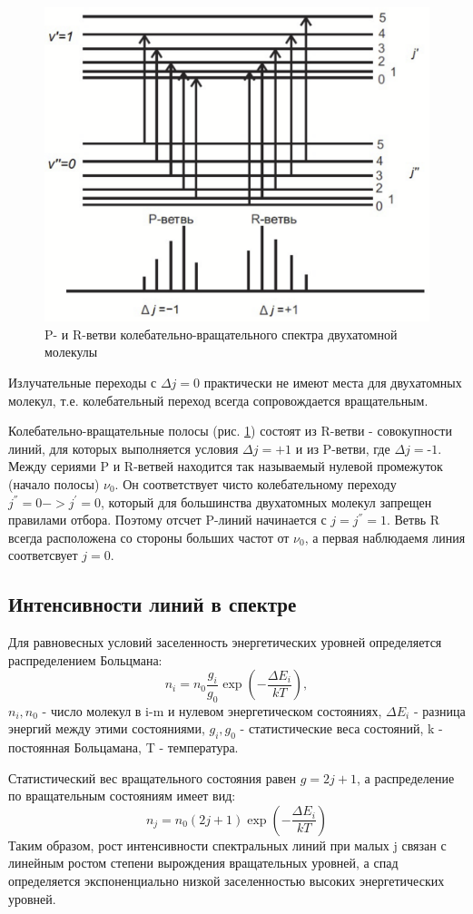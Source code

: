 \documentclass{article}
\begin{document}
\begin{figure}
    \includegraphics[width=\linewidth]{теория.png}
    \caption{P- и R-ветви колебательно-вращательного спектра двухатомной молекулы}
    \label{колебательные уровни двухатомной молекулы}
\end{figure}
\par Излучательные переходы с $\Delta j = 0$ практически не имеют места для двухатомных молекул, т.е. колебательный переход всегда сопровождается вращательным.
\par Колебательно-вращательные полосы (рис. \ref{колебательные уровни двухатомной молекулы}) состоят из R-ветви - совокупности линий, для которых выполняется условия $\Delta j = \text{+1}$ и из P-ветви, где $\Delta j = \text{-1}$. Между сериями P и R-ветвей находится так называемый нулевой промежуток (начало полосы) $\nu_0$. Он соответствует чисто колебательному переходу $j^{''} = 0 -> j^{'} = 0$, который для большинства двухатомных молекул запрещен правилами отбора. Поэтому отсчет P-линий начинается с $j = j^{''} = 1$. Ветвь R всегда расположена со стороны больших частот от $\nu_0$, а первая наблюдаемя линия соответсвует $j = 0$.
\newpage

\subsection{Интенсивности линий в спектре}\;
\par Для равновесных условий заселенность энергетических уровней
определяется распределением Больцмана:
\[n_i = n_0 \frac{g_i}{g_0} \exp{\left(-\frac{\Delta E_i}{kT}\right)},\]
$n_i, n_0$ - число молекул в i-m и нулевом энергетическом состояниях, $\Delta E_i$ - разница энергий между этими состояниями, $g_i, g_0$ - статистические веса состояний, k - постоянная Больцамана, T - температура.
\par Статистический вес вращательного состояния равен $g = 2j+1$, а распределение по вращательным состояниям имеет вид:
\[n_j = n_0(2j+1)\exp{\left(-\frac{\Delta E_i}{kT}\right)}\]
Таким образом, рост интенсивности спектральных линий при малых j связан с линейным ростом степени вырождения вращательных уровней, а спад определяется экспоненциально низкой заселенностью высоких энергетических уровней.
\end{document}
